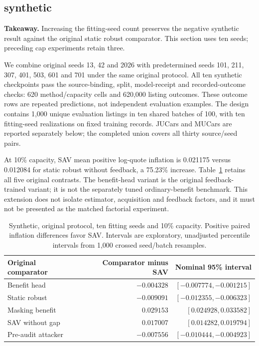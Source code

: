 \documentclass[11pt]{article}
\begin{document}
\subsection{synthetic}
\noindent\textbf{Takeaway.} Increasing the fitting-seed count preserves the
negative synthetic result against the original static robust comparator.
This section uses ten seeds; preceding cap experiments retain three.

We combine original seeds 13, 42 and 2026 with predetermined seeds 101, 211,
307, 401, 503, 601 and 701 under the same original protocol. All ten synthetic
checkpoints pass the source-binding, split, model-receipt and recorded-outcome
checks: 620 method/capacity cells and 620,000 listing outcomes. These outcome
rows are repeated predictions, not independent evaluation examples. The design
contains 1,000 unique evaluation listings in ten shared batches of 100,
with ten fitting-seed realizations on fixed training records. JUCars and MUCars
are reported separately below; the completed union covers all thirty source/seed pairs.

At 10\% capacity, SAV mean positive log-quote inflation is 0.021175 versus
0.012084 for static robust without feedback, a 75.23\% increase. Table~\ref{tab:tenseed}
retains all five original contrasts. The benefit-head variant is the original
feedback-trained variant; it is not the separately tuned ordinary-benefit
benchmark. This extension does not isolate estimator, acquisition and feedback
factors, and it must not be presented as the matched factorial experiment.

\begin{table}[htbp]
\centering\small
\begin{tabular}{lrr}
\toprule
Original comparator & Comparator minus SAV & Nominal 95\% interval\\
\midrule
Benefit head & $-0.004328$ & $[-0.007774,-0.001215]$\\
Static robust & $-0.009091$ & $[-0.012355,-0.006323]$\\
Masking benefit & $0.029153$ & $[0.024928,0.033582]$\\
SAV without gap & $0.017007$ & $[0.014282,0.019794]$\\
Pre-audit attacker & $-0.007556$ & $[-0.010444,-0.004923]$\\
\bottomrule
\end{tabular}
\caption{Synthetic, original protocol, ten fitting seeds and 10\% capacity.
Positive paired inflation differences favor SAV. Intervals are exploratory,
unadjusted percentile intervals from 1,000 crossed seed/batch resamples.}
\label{tab:tenseed}
\end{table}
\end{document}
